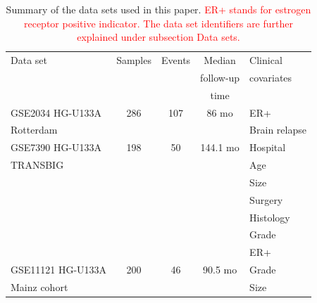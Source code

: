 \documentclass[letterpaper,12pt]{article}
\begin{document}
\begin{table}[h]
\centering
\caption{Summary of the data sets used in this paper. \textcolor{red}{ER+ stands for estrogen receptor positive indicator. The data set identifiers are further explained under subsection Data sets.}}
\label{Table:DataSets}
\begin{small}
    \begin{tabular}{ | l | c | c | c | l |} 
    \hline
    Data set & Samples & Events & Median & Clinical \\ &&& follow-up & covariates \\&&& time & \\ \hline \hline
    GSE2034 HG-U133A		& 286 	& 107 & 86 mo & ER+\\ 
		Rotterdam &&&& Brain relapse\\\hline
		GSE7390 HG-U133A		& 198 	& 50 	& 144.1 mo & Hospital \\ TRANSBIG  &&&& Age\\ &&&& Size\\&&&& Surgery\\&&&& Histology\\&&&& Grade\\&&&& ER+\\\hline
		GSE11121 HG-U133A		& 200 	& 46 	& 90.5 mo & Grade\\ 
		Mainz cohort &&&& Size\\\hline
    \end{tabular}
\end{small}
\end{table}
\end{document}
